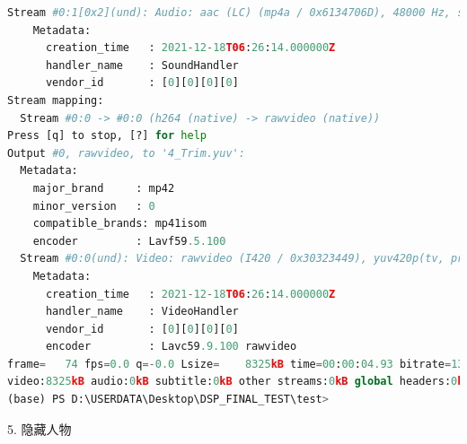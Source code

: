 \documentclass[10pt,UTF8]{ctexart}
\begin{document}
\begin{lstlisting}[language={python}]
  Stream #0:1[0x2](und): Audio: aac (LC) (mp4a / 0x6134706D), 48000 Hz, stereo, fltp, 198 kb/s (default)
    Metadata:
      creation_time   : 2021-12-18T06:26:14.000000Z
      handler_name    : SoundHandler
      vendor_id       : [0][0][0][0]
Stream mapping:
  Stream #0:0 -> #0:0 (h264 (native) -> rawvideo (native))
Press [q] to stop, [?] for help
Output #0, rawvideo, to '4_Trim.yuv':
  Metadata:
    major_brand     : mp42
    minor_version   : 0
    compatible_brands: mp41isom
    encoder         : Lavf59.5.100
  Stream #0:0(und): Video: rawvideo (I420 / 0x30323449), yuv420p(tv, progressive), 320x240 [SAR 27:64 DAR 9:16], q=2-31, 13824 kb/s, 15 fps, 15 tbn (default)
    Metadata:
      creation_time   : 2021-12-18T06:26:14.000000Z
      handler_name    : VideoHandler
      vendor_id       : [0][0][0][0]
      encoder         : Lavc59.9.100 rawvideo
frame=   74 fps=0.0 q=-0.0 Lsize=    8325kB time=00:00:04.93 bitrate=13824.0kbits/s dup=1 drop=69 speed=5.28x
video:8325kB audio:0kB subtitle:0kB other streams:0kB global headers:0kB muxing overhead: 0.000000%
(base) PS D:\USERDATA\Desktop\DSP_FINAL_TEST\test>
\end{lstlisting}

5. 隐藏人物
\end{document}
